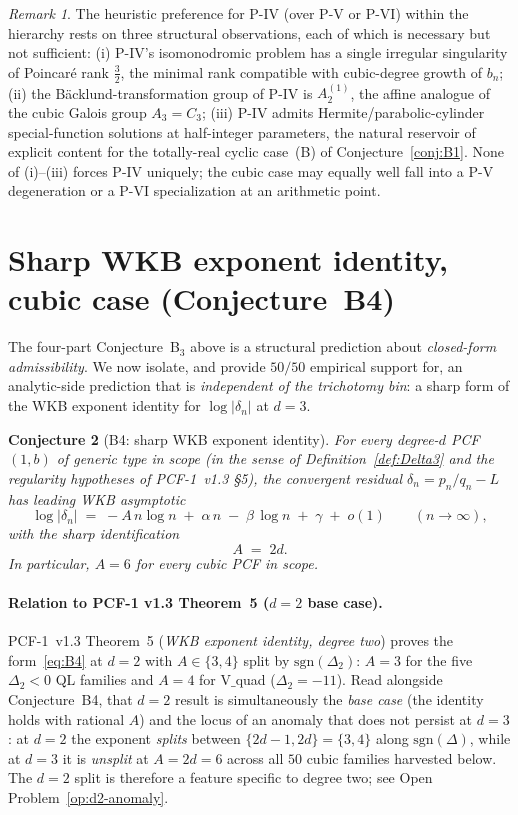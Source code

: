\documentclass[11pt,a4paper]{article}
\newtheorem{conjecture}{Conjecture}
\theoremstyle{definition}
\theoremstyle{remark}
\newtheorem{remark}[conjecture]{Remark}
\begin{document}
\begin{remark}\label{rem:painleveIV}
The heuristic preference for P-IV (over P-V or P-VI) within the
hierarchy rests on three structural observations, each of which is
necessary but not sufficient: (i) P-IV's isomonodromic problem has a
single irregular singularity of Poincar\'e rank $\frac{3}{2}$, the
minimal rank compatible with cubic-degree growth of $b_{n}$;
(ii) the B\"acklund-transformation group of P-IV is $A_{2}^{(1)}$, the
affine analogue of the cubic Galois group $A_{3}=C_{3}$;
(iii) P-IV admits Hermite/parabolic-cylinder special-function solutions
at half-integer parameters, the natural reservoir of explicit content
for the totally-real cyclic case~(B) of Conjecture~\ref{conj:B1}. None
of (i)--(iii) forces P-IV uniquely; the cubic case may equally well
fall into a P-V degeneration or a P-VI specialization at an
arithmetic point.
\end{remark}

\section{Sharp WKB exponent identity, cubic case (Conjecture~B4)}\label{sec:B4}

The four-part Conjecture~B$_{3}$ above is a structural prediction
about \emph{closed-form admissibility}. We now isolate, and provide
$50/50$ empirical support for, an analytic-side prediction that is
\emph{independent of the trichotomy bin}: a sharp form of the WKB
exponent identity for $\log|\delta_{n}|$ at $d=3$.

\begin{conjecture}[B4: sharp WKB exponent identity]\label{conj:B4}
For every degree-$d$ PCF $(1,b)$ of generic type in scope (in the sense
of Definition~\ref{def:Delta3} and the regularity hypotheses of
PCF-1~v1.3 \S{}5), the convergent residual $\delta_{n}=p_{n}/q_{n}-L$
has leading WKB asymptotic
\begin{equation}\label{eq:B4}
\log|\delta_{n}|\;=\;-A\,n\log n\;+\;\alpha\, n\;-\;\beta\,\log n\;+\;\gamma\;+\;o(1)
\qquad (n\to\infty),
\end{equation}
with the sharp identification
\[
\boxed{\;A\;=\;2d.\;}
\]
In particular, $A=6$ for every cubic PCF in scope.
\end{conjecture}

\paragraph{Relation to PCF-1 v1.3 Theorem~5 ($d=2$ base case).}
PCF-1~v1.3 Theorem~5 (\emph{WKB exponent identity, degree two}) proves
the form~\eqref{eq:B4} at $d=2$ with $A\in\{3,4\}$ split by
$\mathrm{sgn}(\Delta_{2})$: $A=3$ for the five $\Delta_{2}<0$ QL
families and $A=4$ for V$\_$quad ($\Delta_{2}=-11$). Read alongside
Conjecture~B4, that $d=2$ result is simultaneously the \emph{base
case} (the identity holds with rational $A$) and the locus of an
anomaly that does not persist at $d=3$: at $d=2$ the exponent
\emph{splits} between $\{2d-1, 2d\}=\{3, 4\}$ along $\mathrm{sgn}(\Delta)$,
while at $d=3$ it is \emph{unsplit} at $A=2d=6$ across all $50$ cubic
families harvested below. The $d=2$ split is therefore a feature
specific to degree two; see Open
Problem~\ref{op:d2-anomaly}.
\end{document}
